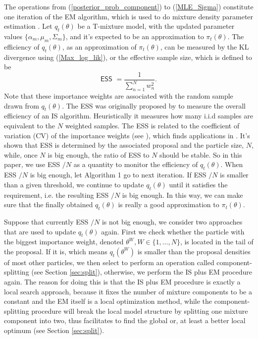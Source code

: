 \documentclass[aoas]{imsart}
\def\ESS{\textsf{ESS }}
\begin{document}
The operations from (\ref{posterior_prob_component}) to
(\ref{MLE_Sigma}) constitute one iteration of the EM algorithm,
which is used to do mixture density parameter estimation
\citep{peel2000rmm}. Let $q_t(\theta)$ be a T-mixture model, with
the updated parameter values $\{\alpha_m,\mu_m,\Sigma_m\}$, and it's
expected to be an approximation to $\pi_t(\theta)$. The efficiency
of $q_t(\theta)$, as an approximation of $\pi_t(\theta)$, can be
measured by the KL divergence using (\ref{Max_log_lik}), or the
effective sample size, which is defined to be
\begin{equation}\label{ESS}
\ESS=\frac{1}{\sum_{n=1}^N w_n^2}.
\end{equation}
Note that these importance weights are associated with the random
sample drawn from $q_t(\theta)$. The \ESS was originally proposed by
\cite{kong1994sequential} to measure the overall efficiency of an IS
algorithm. Heuristically it measures how many i.i.d samples are
equivalent to the $N$ weighted samples. The \ESS is related to the
coefficient of variation (CV) of the importance weights (see
\cite{kong1994sequential}), which finds applications in
\cite{ardia2008adaptive,cappe2008ais,cornebise2008adaptive}. It's
shown that \ESS is determined by the associated proposal and the
particle size, $N$, while, once $N$ is big enough, the ratio of \ESS
to $N$ should be stable. So in this paper, we use \ESS$/N$ as a
quantity to monitor the efficiency of $q_t(\theta)$. When \ESS$/N$
is big enough, let Algorithm 1 go to next iteration. If \ESS$/N$ is
smaller than a given threshold, we continue to update $q_t(\theta)$
until it satisfies the requirement, i.e. the resulting \ESS$/N$ is
big enough. In this way, we can make sure that the finally obtained
$q_t(\theta)$ is really a good approximation to $\pi_t(\theta)$.

Suppose that currently \ESS$/N$ is not big enough, we consider two
approaches that are used to update $q_t(\theta)$ again. First we
check whether the particle with the biggest importance weight,
denoted $\theta^{W}, W\in\{1,\ldots,N\}$, is located in the tail of
the proposal. If it is, which means $q_t(\theta^{W})$ is smaller
than the proposal densities of most other particles, we then select
to perform an operation called component-splitting (see Section
\ref{sec:split}), otherwise, we perform the IS plus EM procedure
again. The reason for doing this is that the IS plus EM procedure is
exactly a local search approach, because it fixes the number of
mixture components to be a constant and the EM itself is a local
optimization method, while the component-splitting procedure will
break the local model structure by splitting one mixture component
into two, thus facilitates to find the global or, at least a better
local optimum (see Section \ref{sec:split}).
\end{document}
